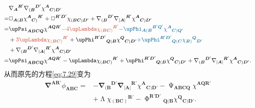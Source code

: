 \begin{equation*}
	\begin{aligned}
		& \mathbf{\nabla }{_{\boldsymbol{A}}}^{\boldsymbol{R} '}\mathbf{\nabla }{_{(\boldsymbol{B}}}^{\boldsymbol{D} '} \chi ^{\boldsymbol{A}}{}_{\boldsymbol{C})\boldsymbol{D} '}\\
		= & \Box _{\boldsymbol{A}(\boldsymbol{B}} \chi ^{\boldsymbol{A}}{}{_{\boldsymbol{C})}}^{\boldsymbol{R} '} +\Box ^{\boldsymbol{R} '\boldsymbol{D} '} \chi _{(\boldsymbol{BC})\boldsymbol{D} '} +\mathbf{\nabla }{_{(\boldsymbol{B}}}^{\boldsymbol{D} '}\mathbf{\nabla }{_{|\boldsymbol{A} |}}^{\boldsymbol{R} '} \chi ^{\boldsymbol{A}}{}_{\boldsymbol{C})\boldsymbol{D} '}\\
		= & \upPsi _{\boldsymbol{ABCQ}} \chi ^{\boldsymbol{AQR} '}\textcolor{mulan}{-4\upLambda \chi }\textcolor{mulan}{{_{(\boldsymbol{BC})}}}\textcolor{mulan}{^{\boldsymbol{R} '}}\textcolor{roulan}{-\upPhi }\textcolor{roulan}{{_{\boldsymbol{A}(\boldsymbol{B}}}}\textcolor{roulan}{^{\boldsymbol{R}\mathbf{'}\boldsymbol{Q} '}}\textcolor{roulan}{\chi }\textcolor{roulan}{^{\boldsymbol{A}}{}}\textcolor{roulan}{_{\boldsymbol{C})\boldsymbol{Q} '}}\\
		& +\textcolor{mulan}{3\upLambda \chi }\textcolor{mulan}{{_{(\boldsymbol{BC})}}}\textcolor{mulan}{^{\boldsymbol{R} '}} +\upPhi ^{\boldsymbol{R} '\boldsymbol{D} '}{}_{\boldsymbol{Q}(\boldsymbol{B}} \chi ^{\boldsymbol{Q}}{}_{\boldsymbol{C})\boldsymbol{D} '}\textcolor{roulan}{+\upPhi }\textcolor{roulan}{^{\boldsymbol{R} '\boldsymbol{D} '}{}}\textcolor{roulan}{_{\boldsymbol{Q}(\boldsymbol{C}}}\textcolor{roulan}{\chi }\textcolor{roulan}{{_{\boldsymbol{B})}}}\textcolor{roulan}{^{\boldsymbol{Q}}{}}\textcolor{roulan}{_{\boldsymbol{D} '}}\\
		& +\mathbf{\nabla }{_{(\boldsymbol{B}}}^{\boldsymbol{D} '}\mathbf{\nabla }{_{|\boldsymbol{A} |}}^{\boldsymbol{R} '} \chi ^{\boldsymbol{A}}{}_{\boldsymbol{C})\boldsymbol{D} '}\\
		= & \upPsi _{\boldsymbol{ABCQ}} \chi ^{\boldsymbol{AQR} '} -\upLambda \chi {_{(\boldsymbol{BC})}}^{\boldsymbol{R} '} +\upPhi ^{\boldsymbol{R} '\boldsymbol{D} '}{}_{\boldsymbol{Q}(\boldsymbol{B}} \chi ^{\boldsymbol{Q}}{}_{\boldsymbol{C})\boldsymbol{D} '} +\mathbf{\nabla }{_{(\boldsymbol{B}}}^{\boldsymbol{D} '}\mathbf{\nabla }{_{|\boldsymbol{A} |}}^{\boldsymbol{R} '} \chi ^{\boldsymbol{A}}{}_{\boldsymbol{C})\boldsymbol{D} '} .
	\end{aligned}
\end{equation*}
从而原先的方程\ref{eq:7.29}变为
\begin{equation}
	\begin{aligned}
		\mathbf{\nabla }^{\boldsymbol{AR} '} \phi _{\boldsymbol{ABC}} = & -\mathbf{\nabla }{_{(\boldsymbol{B}}}^{\boldsymbol{D} '}\mathbf{\nabla }{_{|\boldsymbol{A} |}}^{\boldsymbol{R} '} \chi ^{\boldsymbol{A}}{}_{\boldsymbol{C})\boldsymbol{D} '} -\upPsi _{\boldsymbol{ABCQ}} \chi ^{\boldsymbol{AQR} '}\\
		& +\upLambda \chi {_{(\boldsymbol{BC})}}^{\boldsymbol{R} '} -\upPhi ^{\boldsymbol{R} '\boldsymbol{D} '}{}_{\boldsymbol{Q}(\boldsymbol{B}} \chi ^{\boldsymbol{Q}}{}_{\boldsymbol{C})\boldsymbol{D} '} .
	\end{aligned}
	\label{eq:7.30}
\end{equation}

